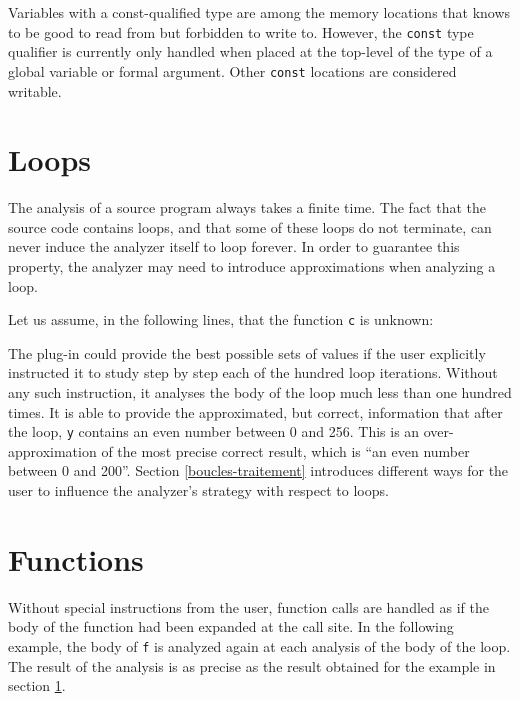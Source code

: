 \documentclass{frama-c-book}
\begin{document}
Variables with a const-qualified type are among the memory locations
that \Eva{} knows to be good to read from but forbidden to
write to. However, the \lstinline|const| type qualifier is currently only
handled when placed at the top-level of the type of a global variable
or formal argument. Other \lstinline|const| locations are considered
writable.

\section{Loops}
\label{boucles}

The analysis of a source program always takes a finite time.
The fact that the source code contains loops, and that some of these
loops do not terminate, can never induce the analyzer itself to loop forever.
In order to guarantee this property, the analyzer may need to
introduce approximations when analyzing a loop.
\medskip

Let us assume, in the following lines, that the function \lstinline|c|
is unknown:

The \Eva{} plug-in could provide the best possible sets of values
if the user explicitly instructed it to study step by step each
of the hundred loop iterations. Without any such instruction,
it analyses the body of the loop much less than
one hundred times. It is able to provide the approximated, but correct,
information that after the loop, \lstinline|y| contains an even number
between 0 and 256. This is an over-approximation of the most precise
correct result,
which is ``an even number between 0 and 200''.
Section \ref{boucles-traitement} introduces different ways for
the user to influence the analyzer's strategy with respect to
loops.

\section{Functions}\label{functions}

Without special instructions from the user, function calls are
handled as if the body of the function had been expanded at the
call site. In the following example, the body of \lstinline|f| is analyzed again
at each analysis of the body of the loop. The result of the analysis
is as precise as the result obtained for the example in section \ref{boucles}.
\end{document}
